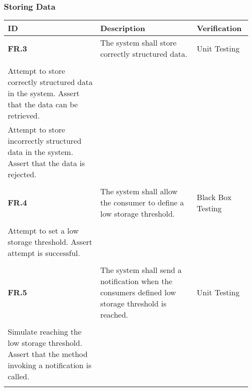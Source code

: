 \subsubsection{Storing Data}
\begin{table}
    \begin{tabular}{|l|l|l|}
        \hline
        \textbf{ID}    & \textbf{Description}                                                                                                                           & \textbf{Verification}                                                                                                                                                                                                                                                                    \\ \hline
        \textbf{FR.3}  & The system shall store correctly structured data.                                                                                              & Unit Testing\\\begin{itemize}\\\item Attempt to store correctly structured data in the system. Assert that the data can be retrieved.\\\item Attempt to store incorrectly structured data in the system. Assert that the data is rejected.\\\end{itemize}                                \\ \hline
        \textbf{FR.4}  & The system shall allow the consumer to define a low storage threshold.                                                                         & Black Box Testing\\\begin{itemize}\\\item Attempt to set a low storage threshold. Assert attempt is successful.\\\end{itemize}                                                                                                                                                           \\ \hline
        \textbf{FR.5}  & The system shall send a notification when the consumers defined low storage threshold is reached.                                              & Unit Testing\\\begin{itemize}\\\item Simulate reaching the low storage threshold. Assert that the method invoking a notification is called.\\\end{itemize}                                                                                                                               \\ \hline

\end{tabular}
\end{table}
